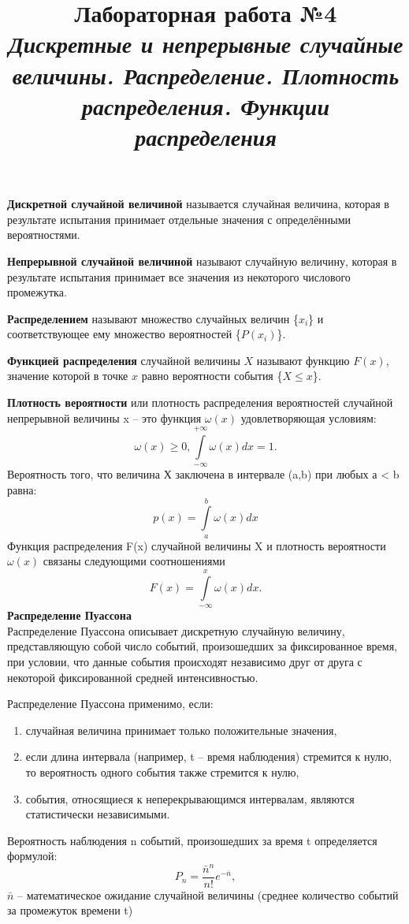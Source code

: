 \documentclass[14pt,a4paper]{article}
\title{Лабораторная работа №4 \\ \textit{Дискретные и непрерывные случайные величины. Распределение. Плотность распределения. Функции распределения}}
\begin{document}
\maketitle
\textbf{Дискретной случайной величиной} называется случайная величина, которая в результате испытания принимает отдельные значения с определёнными вероятностями.

\textbf{Непрерывной случайной величиной} называют случайную величину, которая в результате испытания принимает все значения из некоторого числового промежутка.

\textbf{Распределением} называют множество случайных величин \{$x_i$\} и соответствующее ему множество вероятностей \{$P(x_i)$\}.

\textbf{Функцией распределения} случайной величины $X$ называют функцию $F(x)$, значение которой в точке $x$ равно вероятности события \{$X \leqslant  x$\}.

\textbf{Плотность вероятности} или плотность распределения вероятностей случайной непрерывной величины x – это функция $\omega(x)$ удовлетворяющая условиям:  
\begin{equation}
    \omega(x) \geqslant 0, \int\limits^{+\infty}_{-\infty}\omega(x)dx = 1.
\end{equation}
Вероятность того, что величина Х заключена в интервале (a,b) при любых а < b равна:
\begin{equation}
    p(x) = \int\limits^b_a \omega(x)dx
\end{equation}
Функция распределения F(x) случайной величины X и плотность вероятности $\omega(x)$ связаны следующими соотношениями 
\begin{equation}
    F(x) = \int\limits^{x}_{-\infty}\omega(x)dx.
\end{equation}
\textbf{Распределение Пуассона} \\
Распределение Пуассона описывает дискретную случайную величину, представляющую собой число событий, произошедших за фиксированное время, при условии, что данные события происходят независимо друг от друга с некоторой фиксированной средней интенсивностью. 

Распределение Пуассона применимо, если:
\begin{enumerate}
    \item случайная величина принимает только положительные значения, 
    \item если длина интервала (например, t – время наблюдения) стремится к нулю, то вероятность одного события также стремится к нулю,
    \item события, относящиеся к неперекрывающимся интервалам, являются статистически независимыми.
\end{enumerate} 
Вероятность наблюдения n событий, произошедших за время t определяется формулой:
\begin{equation}
    P_n = \frac{{\bar{n}}^n}{n!}e^{-\bar{n}},
\end{equation}
$\bar{n}$ – математическое ожидание случайной величины (среднее количество событий за  промежуток времени t)
\end{document}
